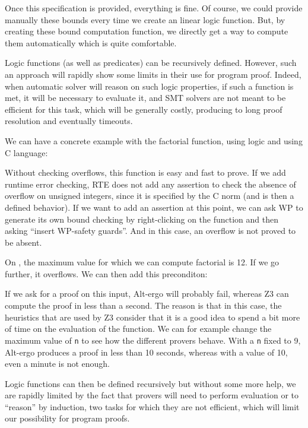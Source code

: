 Once this specification is provided, everything is fine. Of course, we
could provide manually these bounds every time we create an linear logic
function. But, by creating these bound computation function, we directly
get a way to compute them automatically which is quite comfortable.





Logic functions (as well as predicates) can be recursively defined.
However, such an approach will rapidly show some limits in their use for
program proof. Indeed, when automatic solver will reason on such logic
properties, if such a function is met, it will be necessary to evaluate
it, and SMT solvers are not meant to be efficient for this task, which
will be generally costly, producing to long proof resolution and
eventually timeouts.

We can have a concrete example with the factorial function, using logic
and using C language:






Without checking overflows, this function is easy and fast to prove. If
we add runtime error checking, RTE does not add any assertion to check
the absence of overflow on unsigned integers, since it is specified by
the C norm (and is then a defined behavior). If we want to add an
assertion at this point, we can ask WP to generate its own bound
checking by right-clicking on the function and then asking ``insert
WP-safety guards''. And in this case, an overflow is not proved to be
absent.



On , the maximum value for which we can compute
factorial is 12. If we go further, it overflows. We can then add this
preconditon:






If we ask for a proof on this input, Alt-ergo will probably fail,
whereas Z3 can compute the proof in less than a second. The reason is
that in this case, the heuristics that are used by Z3 consider that it
is a good idea to spend a bit more of time on the evaluation of the
function. We can for example change the maximum value of \texttt{n} to
see how the different provers behave. With a \texttt{n} fixed to 9,
Alt-ergo produces a proof in less than 10 seconds, whereas with a value
of 10, even a minute is not enough.



Logic functions can then be defined recursively but without some more
help, we are rapidly limited by the fact that provers will need to
perform evaluation or to ``reason'' by induction, two tasks for which
they are not efficient, which will limit our possibility for program
proofs.
